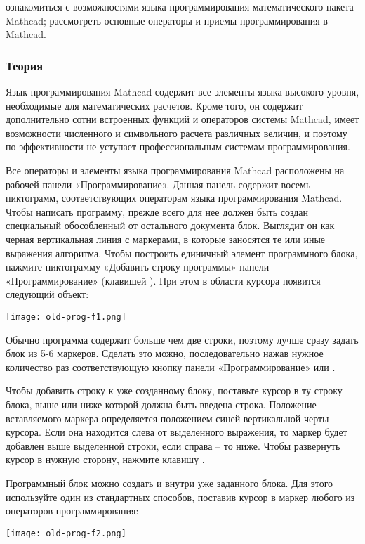 
\goal ознакомиться с возможностями языка программирования математического пакета Mathcad; рассмотреть основные операторы и приемы программирования в Mathcad.

\subsubsection{Теория}
Язык программирования Mathcad содержит все элементы языка высокого уровня, необходимые для математических расчетов. Кроме того, он содержит дополнительно сотни встроенных функций и операторов системы Mathcad, имеет возможности численного и символьного расчета различных величин, и поэтому по эффективности не уступает профессиональным системам программирования.

Все операторы и элементы языка программирования Mathcad расположены на рабочей панели «Программирование». Данная панель содержит восемь пиктограмм, соответствующих операторам языка программирования Mathcad. 
Чтобы написать программу, прежде всего для нее должен быть создан специальный обособленный от остального документа блок. Выглядит он как черная вертикальная линия с маркерами, в которые заносятся те или иные выражения алгоритма. Чтобы построить единичный элемент программного блока, нажмите пиктограмму «Добавить строку программы» панели «Программирование» (клавишей \keys{]}). При этом в области курсора появится следующий объект:
\begin{center}
	\texttt{[image: old-prog-f1.png]}
\end{center}

Обычно программа содержит больше чем две строки, поэтому лучше сразу задать блок из 5-6 маркеров. Сделать это можно, последовательно нажав нужное количество раз соответствующую кнопку панели «Программирование» или \keys{]}.

Чтобы добавить строку к уже созданному блоку, поставьте курсор в ту строку блока, выше или ниже которой должна быть введена строка. Положение вставляемого маркера определяется положением синей вертикальной черты курсора. Если она находится слева от выделенного выражения, то маркер будет добавлен выше выделенной строки, если справа – то ниже. Чтобы развернуть курсор в нужную сторону, нажмите клавишу .

Программный блок можно создать и внутри уже заданного блока. Для этого используйте один из стандартных способов, поставив курсор в маркер любого из операторов программирования:
\begin{center}
	\texttt{[image: old-prog-f2.png]}
\end{center}

